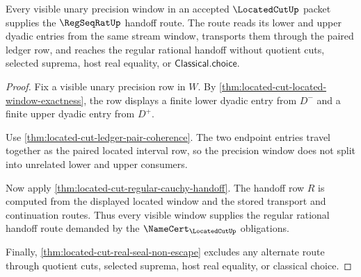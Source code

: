 \begin{theorem}
\label{thm:located-cut-window-handoff-totality}
Every visible unary precision window in an accepted $\LocatedCutUp$ packet
supplies the $\RegSeqRatUp$ handoff route. The route reads its lower and upper
dyadic entries from the same stream window, transports them through the paired
ledger row, and reaches the regular rational handoff without quotient cuts,
selected suprema, host real equality, or $\mathsf{Classical.choice}$.
\end{theorem}
\begin{proof}
Fix a visible unary precision row in $W$. By
\autoref{thm:located-cut-located-window-exactness}, the row displays a finite
lower dyadic entry from $D^{-}$ and a finite upper dyadic entry from $D^{+}$.

Use \autoref{thm:located-cut-ledger-pair-coherence}. The two endpoint entries
travel together as the paired located interval row, so the precision window
does not split into unrelated lower and upper consumers.

Now apply \autoref{thm:located-cut-regular-cauchy-handoff}. The handoff row
$R$ is computed from the displayed located window and the stored transport and
continuation routes. Thus every visible window supplies the regular rational
handoff route demanded by the $\NameCert_{\LocatedCutUp}$ obligations.

Finally, \autoref{thm:located-cut-real-seal-non-escape} excludes any alternate
route through quotient cuts, selected suprema, host real equality, or classical
choice.
\end{proof}

